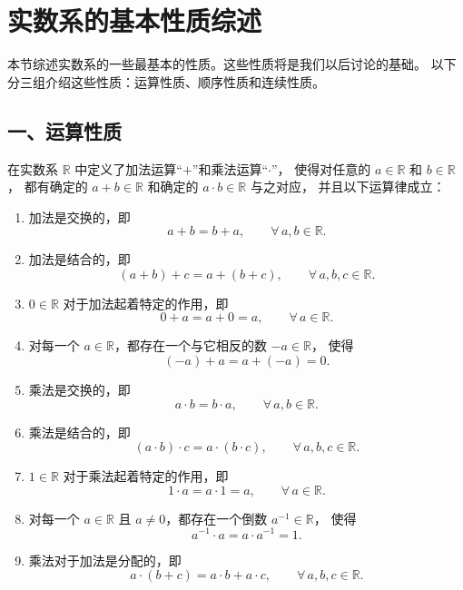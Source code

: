 \documentclass[12pt,a4paper,oneside,utf8]{ctexbook}
\begin{document}
\else%
\fi


\section{实数系的基本性质综述}


本节综述实数系的一些最基本的性质。这些性质将是我们以后讨论的基础。
以下分三组介绍这些性质：运算性质、顺序性质和连续性质。

\subsection*{一、运算性质}

在实数系 $\mathbb{R}$ 中定义了加法运算“$+$”和乘法运算“$\cdot$”，
使得对任意的 $a\in\mathbb{R}$ 和 $b\in\mathbb{R}$，
都有确定的 $a+b\in\mathbb{R}$ 和确定的 $a\cdot b\in\mathbb{R}$ 与之对应，
并且以下运算律成立：

\medskip
\begin{enumerate}[label=$(F_{\arabic*})$]
  \item 加法是交换的，即
  \[
    a+b=b+a,\qquad \forall\, a,b\in\mathbb{R}.
  \]

  \item 加法是结合的，即
  \[
    (a+b)+c=a+(b+c),\qquad \forall\, a,b,c\in\mathbb{R}.
  \]

  \item $0\in\mathbb{R}$ 对于加法起着特定的作用，即
  \[
    0+a=a+0=a,\qquad \forall\, a\in\mathbb{R}.
  \]

  \item 对每一个 $a\in\mathbb{R}$，都存在一个与它相反的数 $-a\in\mathbb{R}$，
  使得
  \[
    (-a)+a=a+(-a)=0.
  \]

  \item 乘法是交换的，即
  \[
    a\cdot b=b\cdot a,\qquad \forall\, a,b\in\mathbb{R}.
  \]

  \item 乘法是结合的，即
  \[
    (a\cdot b)\cdot c=a\cdot(b\cdot c),\qquad \forall\, a,b,c\in\mathbb{R}.
  \]

  \item $1\in\mathbb{R}$ 对于乘法起着特定的作用，即
  \[
    1\cdot a=a\cdot 1=a,\qquad \forall\, a\in\mathbb{R}.
  \]

  \item 对每一个 $a\in\mathbb{R}$ 且 $a\neq 0$，都存在一个倒数 $a^{-1}\in\mathbb{R}$，
  使得
  \[
    a^{-1}\cdot a=a\cdot a^{-1}=1.
  \]

  \item 乘法对于加法是分配的，即
  \[
    a\cdot(b+c)=a\cdot b+a\cdot c,\qquad \forall\, a,b,c\in\mathbb{R}.
  \]
\end{enumerate}
\end{document}

